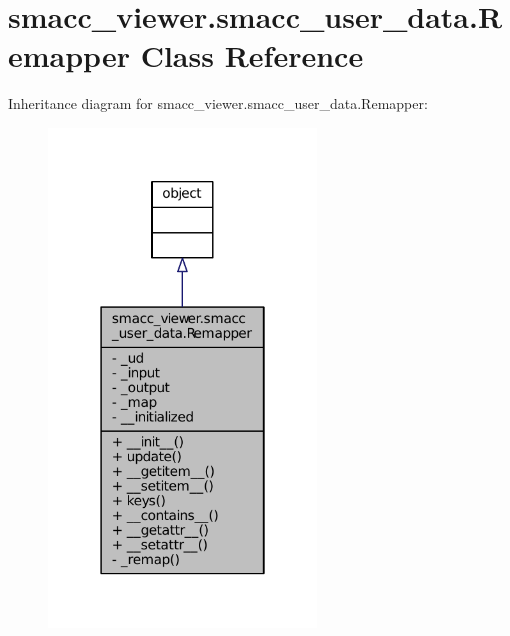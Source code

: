 \hypertarget{classsmacc__viewer_1_1smacc__user__data_1_1Remapper}{}\section{smacc\+\_\+viewer.\+smacc\+\_\+user\+\_\+data.\+Remapper Class Reference}
\label{classsmacc__viewer_1_1smacc__user__data_1_1Remapper}


Inheritance diagram for smacc\+\_\+viewer.\+smacc\+\_\+user\+\_\+data.\+Remapper\+:
\nopagebreak
\begin{figure}[H]
\begin{center}
\leavevmode
\includegraphics[width=202pt]{classsmacc__viewer_1_1smacc__user__data_1_1Remapper__inherit__graph}
\end{center}
\end{figure}


